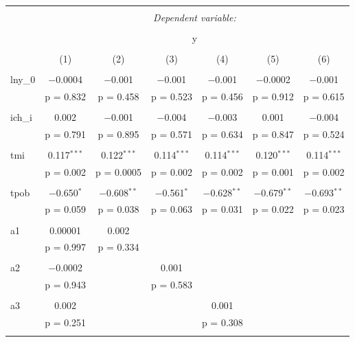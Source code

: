 \begin{table}[!htbp] \centering 
    \tiny
  \caption{} 
  \label{} 
\begin{tabular}{@{\extracolsep{5pt}}lcccccc} 
\\[-1.8ex]\hline 
\hline \\[-1.8ex] 
 & \multicolumn{6}{c}{\textit{Dependent variable:}} \\ 
\cline{2-7} 
\\[-1.8ex] & \multicolumn{6}{c}{y} \\ 
\\[-1.8ex] & (1) & (2) & (3) & (4) & (5) & (6)\\ 
\hline \\[-1.8ex] 
 lny\_0 & $-$0.0004 & $-$0.001 & $-$0.001 & $-$0.001 & $-$0.0002 & $-$0.001 \\ 
  & p = 0.832 & p = 0.458 & p = 0.523 & p = 0.456 & p = 0.912 & p = 0.615 \\ 
  & & & & & & \\ 
 ich\_i & 0.002 & $-$0.001 & $-$0.004 & $-$0.003 & 0.001 & $-$0.004 \\ 
  & p = 0.791 & p = 0.895 & p = 0.571 & p = 0.634 & p = 0.847 & p = 0.524 \\ 
  & & & & & & \\ 
 tmi & 0.117$^{***}$ & 0.122$^{***}$ & 0.114$^{***}$ & 0.114$^{***}$ & 0.120$^{***}$ & 0.114$^{***}$ \\ 
  & p = 0.002 & p = 0.0005 & p = 0.002 & p = 0.002 & p = 0.001 & p = 0.002 \\ 
  & & & & & & \\ 
 tpob & $-$0.650$^{*}$ & $-$0.608$^{**}$ & $-$0.561$^{*}$ & $-$0.628$^{**}$ & $-$0.679$^{**}$ & $-$0.693$^{**}$ \\ 
  & p = 0.059 & p = 0.038 & p = 0.063 & p = 0.031 & p = 0.022 & p = 0.023 \\ 
  & & & & & & \\ 
 a1 & 0.00001 & 0.002 &  &  &  &  \\ 
  & p = 0.997 & p = 0.334 &  &  &  &  \\ 
  & & & & & & \\ 
 a2 & $-$0.0002 &  & 0.001 &  &  &  \\ 
  & p = 0.943 &  & p = 0.583 &  &  &  \\ 
  & & & & & & \\ 
 a3 & 0.002 &  &  & 0.001 &  &  \\ 
  & p = 0.251 &  &  & p = 0.308 &  &  \\ 
  & & & & & & \\ 

\end{tabular}
\end{table}

